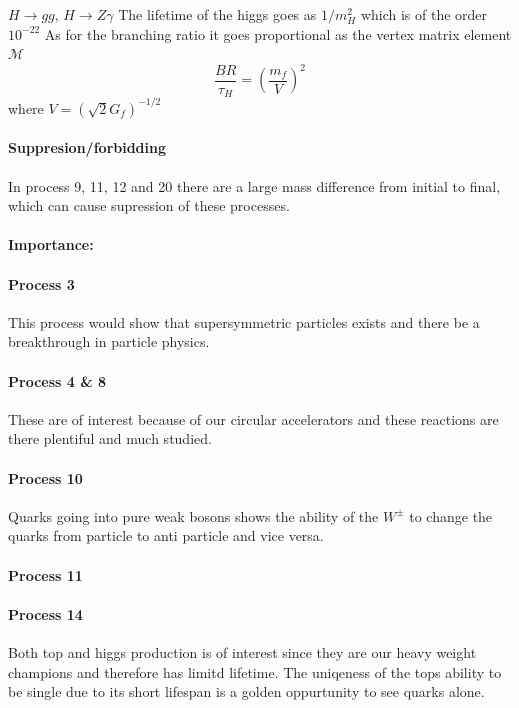 $H \rightarrow gg,\, H \rightarrow Z\gamma$\newline
The lifetime of the higgs goes as $1/m_H^2$ which is of the order $10^{-22}$
As for the branching ratio it goes proportional as the vertex matrix element $\mathcal{M}$
\[ \frac{BR}{\tau_{H}} = \left(\frac{m_f}{V}\right)^2\]
where $V = (\sqrt{2}G_f)^{-1/2}$


\paragraph{Suppresion/forbidding}
In process 9, 11, 12 and 20 there are a large mass difference from initial to final, which
can cause supression of these processes.
\newpage
\paragraph{Importance:}
\paragraph{Process 3}
This process would show that supersymmetric particles exists and there be a breakthrough in 
particle physics.
\paragraph{Process 4 \& 8}
These are of interest because of our circular accelerators and these reactions are there plentiful
and much studied.
\paragraph{Process 10}
Quarks going into pure weak bosons shows the ability of the $W^{\pm}$ to change the quarks from
particle to anti particle and vice versa.
\paragraph{Process 11}

\paragraph{Process 14}
Both top and higgs production is of interest since they are our heavy weight champions and therefore
has limitd lifetime. The uniqeness of the tops ability to be single due to its short lifespan is a
golden oppurtunity to see quarks alone.
